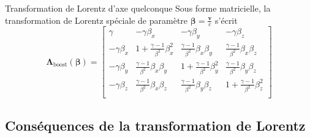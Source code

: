         \begin{omed}{Transformation de Lorentz d’axe quelconque}
            Sous forme matricielle, la transformation de Lorentz spéciale de paramètre $\symbf{\beta} = \frac{\mathbf{v}}{c}$ s’écrit 
            \[ \symbf{\Lambda}_{\text{boost}}(\symbf{\beta}) = \begin{bmatrix}
                \gamma & -\gamma \beta_x & - \gamma \beta_y & - \gamma \beta_z \\
                -\gamma \beta_x & 1 + \frac{\gamma - 1}{\beta^2} \beta_x^2  & \frac{\gamma - 1}{\beta^2} \beta_x \beta_y & \frac{\gamma - 1}{\beta^2} \beta_x \beta_z \\
                -\gamma \beta_y & \frac{\gamma - 1}{\beta^2} \beta_x \beta_y & 1 + \frac{\gamma - 1}{\beta^2} \beta_y^2 & \frac{\gamma - 1}{\beta^2} \beta_y \beta_z \\
                -\gamma \beta_z & \frac{\gamma - 1}{\beta^2} \beta_x \beta_z & \frac{\gamma - 1}{\beta^2} \beta_y \beta_z & 1 + \frac{\gamma - 1}{\beta^2} \beta_z^2 \\
            \end{bmatrix} \]
        \end{omed}

    \subsection{Conséquences de la transformation de Lorentz}

        